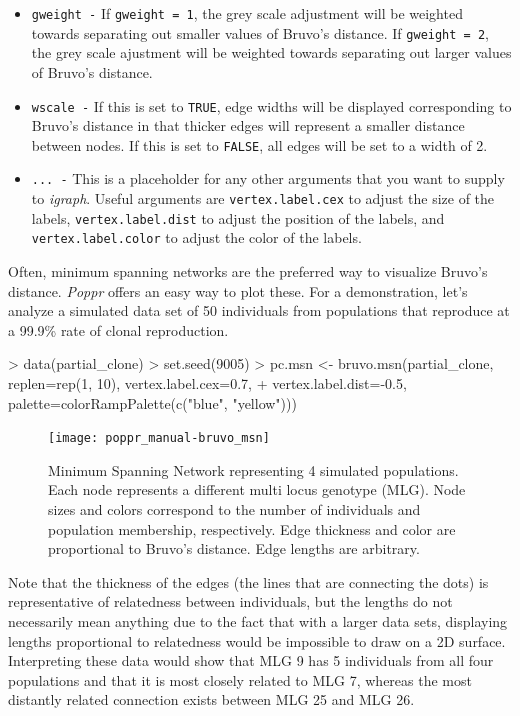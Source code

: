 \documentclass[letterpaper]{article}
\begin{document}
\begin{itemize}
  \item \texttt{gweight -} If \texttt{gweight = 1}, the grey scale adjustment will be weighted towards separating out smaller values of Bruvo's distance. If \texttt{gweight = 2}, the grey scale ajustment will be weighted towards separating out larger values of Bruvo's distance.
  \item \texttt{wscale -} If this is set to \texttt{TRUE}, edge widths will be displayed corresponding to Bruvo's distance in that thicker edges will represent a smaller distance between nodes. If this is set to \texttt{FALSE}, all edges will be set to a width of 2. 
  \item \texttt{... -} This is a placeholder for any other arguments that you want to supply to \textit{igraph}. Useful arguments are \texttt{vertex.label.cex} to adjust the size of the labels, \texttt{vertex.label.dist} to adjust the position of the labels, and \texttt{vertex.label.color} to adjust the color of the labels.
\end{itemize}

Often, minimum spanning networks are the preferred way to visualize Bruvo's distance. \textit{Poppr} offers an easy way to plot these. For a demonstration, let's analyze a simulated data set of 50 individuals from populations that reproduce at a 99.9\% rate of clonal reproduction.

\begin{Schunk}
\begin{Sinput}
> data(partial_clone)
> set.seed(9005)
> pc.msn <- bruvo.msn(partial_clone, replen=rep(1, 10), vertex.label.cex=0.7, 
+           vertex.label.dist=-0.5, palette=colorRampPalette(c("blue", "yellow")))
\end{Sinput}
\end{Schunk}
\begin{figure}[ht!]
  \centering
  \caption{\footnotesize Minimum Spanning Network representing 4 simulated populations. Each node represents a different multi locus genotype (MLG). Node sizes and colors correspond to the number of individuals and population membership, respectively. Edge thickness and color are proportional to Bruvo's distance. Edge lengths are arbitrary.}
  \label{mst_bruvo}
\texttt{[image: poppr\_manual-bruvo\_msn]}
\end{figure}

Note that the thickness of the edges (the lines that are connecting the dots) is representative of relatedness between individuals, but the lengths do not necessarily mean anything due to the fact that with a larger data sets, displaying lengths proportional to relatedness would be impossible to draw on a 2D surface. Interpreting these data would show that MLG 9 has 5 individuals from all four populations and that it is most closely related to MLG 7, whereas the most distantly related connection exists between MLG 25 and MLG 26.
\newpage
\end{document}
